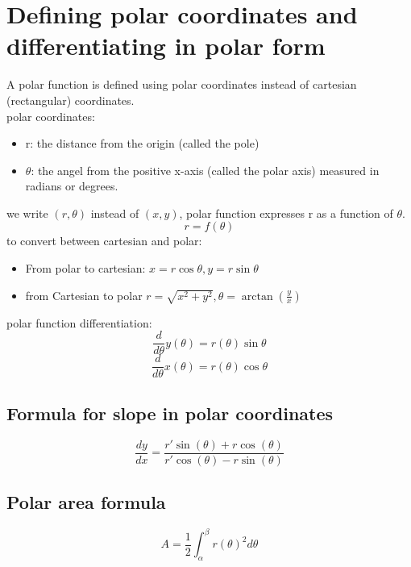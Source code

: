 \documentclass{article}
\begin{document}
                \section{Defining polar coordinates and differentiating in polar form}
                    A polar function is defined using polar coordinates instead of cartesian (rectangular) coordinates.\\
                    polar coordinates: 
                    \begin{itemize}
                        \item r: the distance from the origin (called the pole)
                        \item \(\theta\): the angel from the positive x-axis (called the polar axis) measured in radians or degrees.
                    \end{itemize}
                     we write \((r, \theta)\) instead of \((x, y)\), polar function expresses r as a function of \(\theta\).
                     \[r = f(\theta)\] 
                     to convert between cartesian and polar: 
                     \begin{itemize}
                        \item  From polar to cartesian: \(x = r \cos{\theta}, y = r \sin{\theta}\)
                        \item from Cartesian to polar \(r = \sqrt{x^2 + y^2}, \theta = \arctan (\frac{y}{x})\)
                     \end{itemize}
                     polar function differentiation: 
                    \[\frac{d}{d\theta} y(\theta) = r(\theta)\sin{\theta}\]
                    \[\frac{d}{d\theta} x(\theta) = r(\theta)\cos{\theta}\]
                    \subsection{Formula for slope in polar coordinates}
                     \[\frac{dy}{dx} = \frac{r'\sin(\theta) + r\cos(\theta)}{r'\cos(\theta) - r\sin(\theta)}\]
                     \subsection{Polar area formula}
                        \[A = \frac{1}{2} \int_{\alpha}^{\beta} r{(\theta)}^2 d\theta\]
\end{document}
